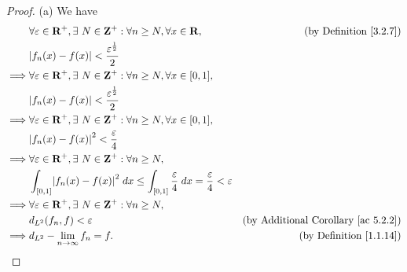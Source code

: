 \begin{proof}{(a)}
    We have
    \begin{align*}
                 & \forall \varepsilon \in \R^+, \exists\ N \in \Z^+ : \forall n \geq N, \forall x \in \R,                                        & \text{(by Definition \ref{3.2.7})}              \\
                 & \abs{f_n(x) - f(x)} < \frac{\varepsilon^{\frac{1}{2}}}{2}                                                                                                                        \\
        \implies & \forall \varepsilon \in \R^+, \exists\ N \in \Z^+ : \forall n \geq N, \forall x \in [0, 1],                                                                                      \\
                 & \abs{f_n(x) - f(x)} < \frac{\varepsilon^{\frac{1}{2}}}{2}                                                                                                                        \\
        \implies & \forall \varepsilon \in \R^+, \exists\ N \in \Z^+ : \forall n \geq N, \forall x \in [0, 1],                                                                                      \\
                 & \abs{f_n(x) - f(x)}^2 < \frac{\varepsilon}{4}                                                                                                                                    \\
        \implies & \forall \varepsilon \in \R^+, \exists\ N \in \Z^+ : \forall n \geq N,                                                                                                            \\
                 & \int_{[0, 1]} \abs{f_n(x) - f(x)}^2 \; dx \leq \int_{[0, 1]} \frac{\varepsilon}{4} \; dx = \frac{\varepsilon}{4} < \varepsilon                                                   \\
        \implies & \forall \varepsilon \in \R^+, \exists\ N \in \Z^+ : \forall n \geq N,                                                                                                            \\
                 & d_{L^2}(f_n, f) < \varepsilon                                                                                                  & \text{(by Additional Corollary \ref{ac 5.2.2})} \\
        \implies & d_{L^2} - \lim_{n \to \infty} f_n = f.                                                                                         & \text{(by Definition \ref{1.1.14})}
    \end{align*}
\end{proof}

